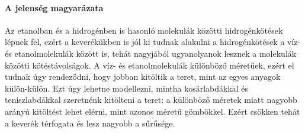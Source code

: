\documentclass[12pt]{article}
\begin{document}
\paragraph{A jelenség magyarázata}
Az etanolban és a hidrogénben is hasonló molekulák közötti hidrogénkötések lépnek fel, ezért a keverékükben is jól ki tudnak alakulni a hidrogénkötések a víz- és etanolmolekulák között is, tehát nagyjából ugyanolyanok lesznek a molekulák közötti kötéstávolságok. A víz- és etanolmolekulák különböző méretűek, ezért el tudnak úgy rendeződni, hogy jobban kitöltik a teret, mint az egyes anyagok külön-külön. Ezt úgy lehetne modellezni, mintha kosárlabdákkal és teniszlabdákkal szeretnénk kitölteni a teret: a különböző méretek miatt nagyobb arányú kitöltést lehet elérni, mint azonos méretű gömbökkel. Ezért csökken tehát a keverék térfogata és lesz nagyobb a sűrűsége.
\end{document}

